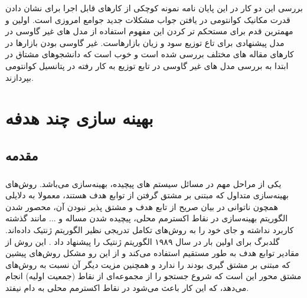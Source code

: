 \documentclass[a4paper,titlepage,12pt,fleqn,oneside]{report}
\begin{document}
	بررسی این دو کار در این پایان نامه نمونه کوچکی از کارهای قابل اجرا برای نشان دادن قدرت مکانیک کوانتومی در یافتن جواب مشکلات جدید جوامع امروزی است. اولین و مهمترین قدم برای مستحکم تر کردن این مفهوم استفاده از مدل های غیر گاوسی در مدل پیشنهادی برای تاع توزیع سود و زیان بازارهاست. غیر گاوسی بودن بازارها در کارهای مقاله های مختلف بررسی شده است و خوب است که دانشجوهای مشتاق در ابتدا به بررسی مدل های غیر گاوسی در تابع توزیع به کار رفته در پتانسیل کوانتومی بپردازند.
	
	\appendix
	\chapter{ بهینه سازی چند هدفه}
	
	\section{مقدمه}
	\paragraph{}
	یکی از مراحل مهم در مسائل سیستم های پیچیده، بهینه‌سازی می‌باشد. روش‌های بهینه‌سازی متداول که مبتنی بر مشتق گرفتن از توابع هدف هستند، معمولا به دلایلی همچون ناتوانی در بیان صریح از تابع هدف و مشتق پذیر نبودن آن، محصور شدن الگوریتم بهینه‌سازی در نقاط اکسترمم محلی، پیچیده شدن مساله و ... مانند گذشته کاربرد نداشته و جای خود را به روش‌های تکامل تدریجی نظیر الگوریتم ژنتیک داده‌ا‌ند. گلدبرگ برای اولین بار در سال ۱۹۸۹ الگوریتم ژنتیک را پیشنهاد داد \cite{Goldberg1989}. این روش از مقادیر توابع هدف به طور مستقیم استفاده می‌کند و از این رو مشکل روش‌های پیشین که مبتنی بر مشتق گیری بودند را ندارد و همچنین مزیت دیگر آن نسبت به روش‌های مشتق محور این است که شروع جستجو را از مجموعه‌ای از نقاط (جمعیت اولیه) انجام می‌دهد، که این کار باعث می‌شود در نقاط اکسترمم محلی به دام نیفتد.
	
\end{document}
